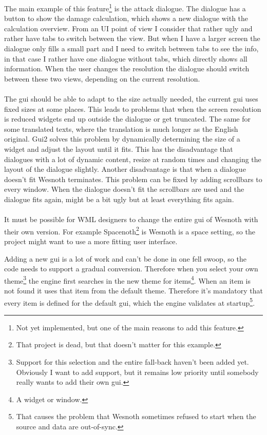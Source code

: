 \documentclass[a4paper,notitlepage,twocolumn,draft]{report}
\begin{document}
The main example of this feature\footnote{Not yet implemented, but one of the
main reasons to add this feature.} is the attack dialogue. The dialogue has a
button to show the damage calculation, which shows a new dialogue with the
calculation overview. From an UI point of view I consider that rather ugly and
rather have tabs to switch between the view. But when I have a larger screen the
dialogue only fills a small part and I need to switch between tabs to see the
info, in that case I rather have one dialogue without tabs, which directly shows
all information. When the user changes the resolution the dialogue should switch
between these two views, depending on the current resolution.

\paragraph{}

The gui should be able to adapt to the size actually needed, the current gui
uses fixed sizes at some places. This leads to problems that when the screen
resolution is reduced widgets end up outside the dialogue or get truncated. The
same for some translated texts, where the translation is much longer as the
English original. Gui2 solves this problem by dynamically determining the size
of a widget and adjust the layout until it fits. This has the disadvantage that
dialogues with a lot of dynamic content, resize at random times and changing the
layout of the dialogue slightly. Another disadvantage is that when a dialogue
doesn't fit Wesnoth terminates. This problem can be fixed by adding scrollbars
to every window. When the dialogue doesn't fit the scrollbars are used and the
dialogue fits again, might be a bit ugly but at least everything fits again.

\paragraph{}

It must be possible for WML designers to change the entire gui of Wesnoth with
their own version. For example Spacenoth\footnote{That project is dead, but
that doesn't matter for this example.} is Wesnoth is a space setting, so the
project might want to use a more fitting user interface.

Adding a new gui is a lot of work and can't be done in one fell swoop, so the
code needs to support a gradual conversion. Therefore when you select your own
theme\footnote{Support for this selection and the entire fall-back haven't been
added yet. Obviously I want to add support, but it remains low priority until
somebody really wants to add their own gui.} the engine first searches in the
new theme for items\footnote{A widget or window.}. When an item is not found it
uses that item from the default theme. Therefore it's mandatory that every item
is defined for the default gui, which the engine validates at
startup\footnote{That causes the problem that Wesnoth sometimes refused to start
when the source and data are out-of-sync.}.
\end{document}
